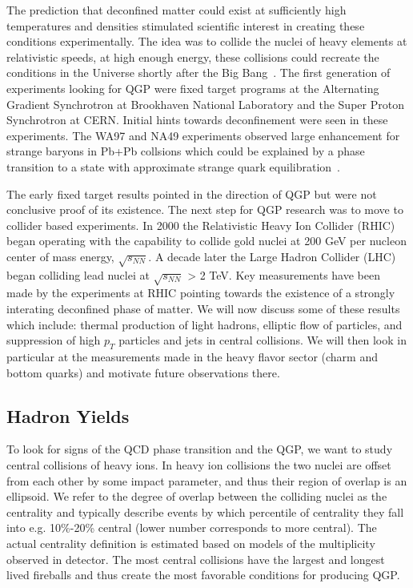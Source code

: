The prediction that deconfined matter could exist at sufficiently high temperatures and densities stimulated scientific interest in creating these conditions experimentally. The idea was to collide the nuclei of heavy elements at relativistic speeds, at high enough energy, these collisions could recreate the conditions in the Universe shortly after the Big Bang~\cite{Baym}. The first generation of experiments looking for QGP were fixed target programs at the Alternating Gradient Synchrotron at Brookhaven National Laboratory and the Super Proton Synchrotron at CERN. Initial hints towards deconfinement were seen in these experiments. The WA97 and NA49 experiments observed large enhancement for strange baryons in Pb+Pb collsions which could be explained by a phase transition to a state with approximate strange quark equilibration~\cite{StrangeE}.

The early fixed target results pointed in the direction of QGP but were not conclusive proof of its existence. The next step for QGP research was to move to collider based experiments. In 2000 the Relativistic Heavy Ion Collider (RHIC) began operating with the capability to collide gold nuclei at 200 GeV per nucleon center of mass energy, $\sqrt{s_{NN}}$. A decade later the Large Hadron Collider (LHC) began colliding lead nuclei at $\sqrt{s_{NN}}$ > 2 TeV. Key measurements have been made by the experiments at RHIC pointing towards the existence of a strongly interating deconfined phase of matter. We will now discuss some of these results which include: thermal production of light hadrons, elliptic flow of particles, and suppression of high $p_T$ particles and jets in central collisions. We will then look in particular at the measurements made in the heavy flavor sector (charm and bottom quarks) and motivate future observations there.

\subsection{Hadron Yields}

To look for signs of the QCD phase transition and the QGP, we want to study central collisions of heavy ions. In heavy ion collisions the two nuclei are offset from each other by some impact parameter, and thus their region of overlap is an ellipsoid. We refer to the degree of overlap between the colliding nuclei as the centrality and typically describe events by which percentile of centrality they fall into e.g. 10\%-20\% central (lower number corresponds to more central). The actual centrality definition is estimated based on models of the multiplicity observed in detector. The most central collisions have the largest and longest lived fireballs and thus create the most favorable conditions for producing QGP. 

